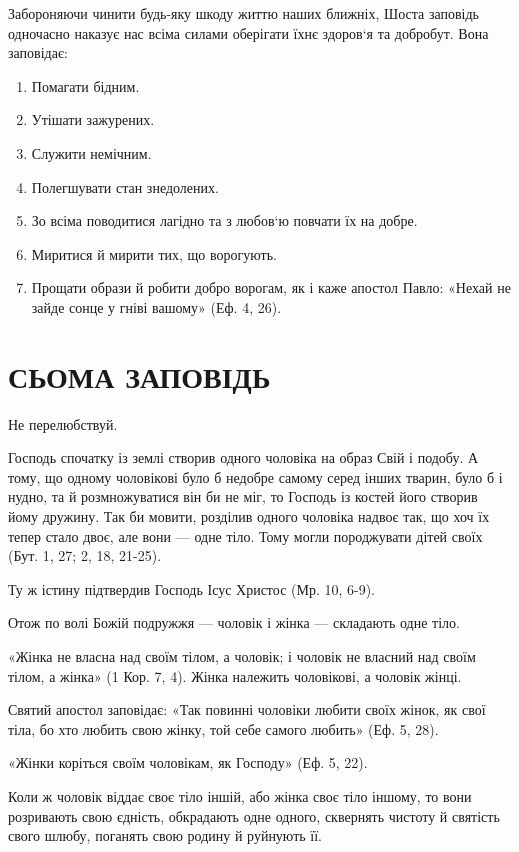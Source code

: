 \documentclass[main.tex]{subfiles}
\begin{document}
Забороняючи чинити будь-яку шкоду життю наших ближніх, Шоста заповідь одночасно наказує нас всіма силами оберігати їхнє здоров`я та добробут. Вона заповідає:

\begin{enumerate}
    \item Помагати бідним.
    \item Утішати зажурених.
    \item Служити немічним.
    \item Полегшувати стан знедолених.
    \item Зо всіма поводитися лагідно та з любов`ю повчати їх на добре.
    \item Миритися й мирити тих, що ворогують.
    \item Прощати образи й робити добро ворогам, як і каже апостол Павло: «Нехай не зайде сонце у гніві вашому» (Еф. 4, 26).
\end{enumerate}

\section{СЬОМА ЗАПОВІДЬ}

Не перелюбствуй.

Господь спочатку із землі створив одного чоловіка на образ Свій і подобу. А тому, що одному чоловікові було б недобре самому серед інших тварин, було б і нудно, та й розмножуватися він би не міг, то Господь із костей його створив йому дружину. Так би мовити, розділив одного чоловіка надвоє так, що хоч їх тепер стало двоє, але вони — одне тіло. Тому могли породжувати дітей своїх (Бут. 1, 27; 2, 18, 21-25).

Ту ж істину підтвердив Господь Ісус Христос (Мр. 10, 6-9).

Отож по волі Божій подружжя — чоловік і жінка — складають одне тіло.

«Жінка не власна над своїм тілом, а чоловік; і чоловік не власний над своїм тілом, а жінка» (1 Кор. 7, 4). Жінка належить чоловікові, а чоловік жінці.

Святий апостол заповідає: «Так повинні чоловіки любити своїх жінок, як свої тіла, бо хто любить свою жінку, той себе самого любить» (Еф. 5, 28).

«Жінки коріться своїм чоловікам, як Господу» (Еф. 5, 22).

Коли ж чоловік віддає своє тіло іншій, або жінка своє тіло іншому, то вони розривають свою єдність, обкрадають одне одного, сквернять чистоту й святість свого шлюбу, поганять свою родину й руйнують її.
\end{document}
